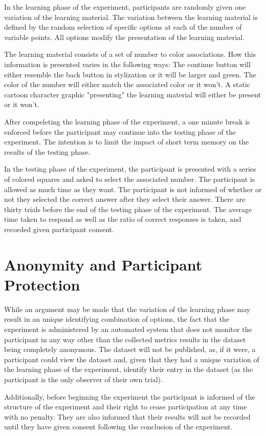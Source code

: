 \documentclass[12pt]{report}
\begin{document}
In the learning phase of the experiment, participants are randomly given one variation of the learning material. The variation between the learning material is defined by the random selection of specific options at each of the number of variable points. All options modify the presentation of the learning material.

The learning material consists of a set of number to color associations. How this information is presented varies in the following ways: The continue button will either resemble the back button in stylization or it will be larger and green. The color of the number will either match the associated color or it won't. A static cartoon character graphic "presenting" the learning material will either be present or it won't.

After compeleting the learning phase of the experiment, a one minute break is enforced before the participant may continue into the testing phase of the experiment. The intention is to limit the impact of short term memory on the results of the testing phase.

In the testing phase of the experiment, the participant is presented with a series of colored squares and asked to select the associated number. The participant is allowed as much time as they want. The participant is not informed of whether or not they selected the correct answer after they select their answer. There are thirty trials before the end of the testing phase of the experiment. The average time taken to respond as well as the ratio of correct responses is taken, and recorded given participant consent.

\section{Anonymity and Participant Protection}

While an argument may be made that the variation of the learning phase may result in an unique identifying combination of options, the fact that the experiment is administered by an automated system that does not monitor the participant in any way other than the collected metrics results in the dataset being completely anonymous. The dataset will not be published, as, if it were, a participant could view the dataset and, given that they had a unique variation of the learning phase of the experiment, identify their entry in the dataset (as the participant is the only observer of their own trial).

Additionally, before beginning the experiment the participant is informed of the structure of the experiment and their right to cease participation at any time with no penalty. They are also informed that their results will not be recorded until they have given consent following the conclusion of the experiment.
\end{document}
